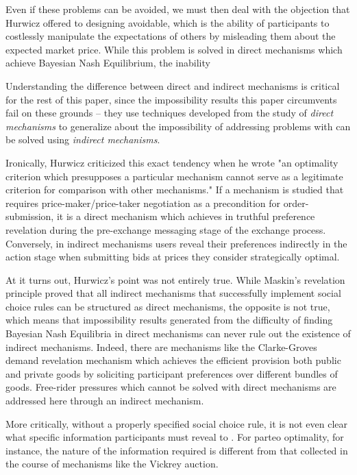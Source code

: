 \documentclass[sigconf,anonymous]{aamas}
\begin{document}
Even if these problems can be avoided, we must then deal with the objection that Hurwicz offered to designing avoidable, which is the ability of participants to costlessly manipulate the expectations of others by misleading them about the expected market price. While this problem is solved in direct mechanisms which achieve Bayesian Nash Equilibrium, the inability 







Understanding the difference between direct and indirect mechanisms is critical for the rest of this paper, since the impossibility results this paper circumvents fail on these grounds -- they use techniques developed from the study of \textit{direct mechanisms} to generalize about the impossibility of addressing problems with can be solved using \textit{indirect mechanisms}.

Ironically, Hurwicz criticized this exact tendency when he wrote "an optimality criterion which presupposes a particular mechanism cannot serve as a legitimate criterion for comparison with other mechanisms." If a mechanism is studied that requires price-maker/price-taker negotiation as a precondition for order-submission, it is a direct mechanism which achieves in truthful preference revelation during the pre-exchange messaging stage of the exchange process. Conversely, in indirect mechanisms users reveal their preferences indirectly in the action stage when submitting bids at prices they consider strategically optimal.

At it turns out, Hurwicz's point was not entirely true. While Maskin's revelation principle proved that all indirect mechanisms that successfully implement social choice rules can be structured as direct mechanisms, the opposite is not true, which means that impossibility results generated from the difficulty of finding Bayesian Nash Equilibria in direct mechanisms can never rule out the existence of indirect mechanisms. Indeed, there are mechanisms like the Clarke-Groves demand revelation mechanism which achieves the efficient provision both public and private goods by soliciting participant preferences over different bundles of goods. Free-rider pressures which cannot be solved with direct mechanisms are addressed here through an indirect mechanism.





More critically, without a properly specified social choice rule, it is not even clear what specific information participants must reveal to . For parteo optimality, for instance, the nature of the information required is different from that collected in the course of mechanisms like the Vickrey auction.
\end{document}
